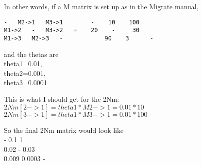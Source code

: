 \begin{enumerate}
In other words, if a M matrix is set up as in the Migrate manual,
\begin{verbatim}
- 	M2->1	M3->1	     -    10    100	
M1->2	-	M3->2   =    20    -     30
M1->3	M2->3	-            90    3      -
\end{verbatim}

and the thetas are\\
theta1=0.01,\\
theta2=0.001,\\
theta3=0.0001

This is what I should get for the 2Nm:\\
$2Nm[2->1] = theta1 * M2->1 = 0.01*10$\\
$2Nm[3->1] = theta1 * M3->1 = 0.01*100$

So the final 2Nm matrix would look like\\
- 	0.1 	1\\
0.02 	- 	0.03\\
0.009 	0.0003 	-\\

\end{enumerate}




